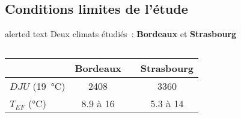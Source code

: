 \documentclass[xcolor=x11names, compress, 11pt]{beamer}
\newcommand{\addalert}[1]{%
\begin{beamercolorbox}[sep=2pt,center,shadow=true,rounded=true]{alerted text}
    #1\par%
\end{beamercolorbox}%
}
\begin{document}
\subsection{Conditions limites de l’étude}
\begin{frame}[t]
    \centering
    \addalert{\small Deux climats étudiés~: \textbf{Bordeaux} et \textbf{Strasbourg}}
    \vfill
    \scriptsize
    \begin{columns}
        \begin{column}{0.5\textwidth}
            \begin{table}
            \begin{tabular}{l c c c}
                \toprule
                                               & Bordeaux           &  & Strasbourg          \\
                \midrule
                $DJU$ (\SI{19}{\celsius})      & \num{2408}         &  & \num{3360}          \\
                \addlinespace[\defaultaddspace]
                $T_{EF}$ (\si{\celsius})       & \num{8.9} à \num{16}  &  & \num{5.3} à \num{14}    \\
                \bottomrule
            \end{tabular}
            \end{table}
        \end{column}
        \begin{column}{0.5\textwidth}
        \end{column}
    \end{columns}
    \vfill
\end{frame}


\end{document}
